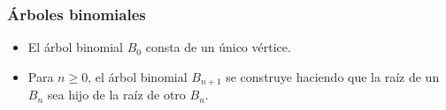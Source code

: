 \documentclass[english, spanish, fleqn,%
hyperref = {colorlinks, urlcolor = blue}%
]{beamer}
\begin{document}
\begin{frame}
  \setcounter{beamerpauses}{2}
  \frametitle{Árboles binomiales}

  \begin{itemize}
 \item
    El árbol binomial \(B_0\) consta de un único vértice.
  \item
    Para \(n \ge 0\),
    el árbol binomial \(B_{n + 1}\) se construye
    haciendo que la raíz de un \(B_n\) sea hijo de la raíz de otro \(B_n\).
  \end{itemize}
\end{frame}
\end{document}
